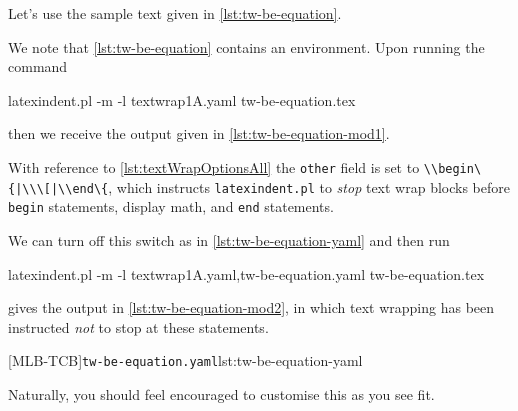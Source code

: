 \begin{example}
  Let's use the sample text given in \cref{lst:tw-be-equation}.  


  We note that \cref{lst:tw-be-equation} contains an environment. Upon running the command
  \begin{commandshell}
latexindent.pl -m -l textwrap1A.yaml tw-be-equation.tex
\end{commandshell}
  then we receive the output given in \cref{lst:tw-be-equation-mod1}.


  With reference to \vref{lst:textWrapOptionsAll} the \texttt{other} field is set to
  \lstinline!\\begin\{|\\\[|\\end\{!, which instructs \texttt{latexindent.pl} to
  \emph{stop} text wrap blocks before \texttt{begin} statements, display math, and
  \texttt{end} statements.

  We can turn off this switch as in \cref{lst:tw-be-equation-yaml} and then run
  \begin{widepage}
   \begin{commandshell}
latexindent.pl -m -l textwrap1A.yaml,tw-be-equation.yaml tw-be-equation.tex
\end{commandshell}
  \end{widepage}
  gives the output in \cref{lst:tw-be-equation-mod2}, in which text wrapping has been
  instructed \emph{not} to stop at these statements.

  [MLB-TCB]{\texttt{tw-be-equation.yaml}}{lst:tw-be-equation-yaml}

  \begin{widepage}
  \end{widepage}

  Naturally, you should feel encouraged to customise this as you see fit.
 \end{example}

